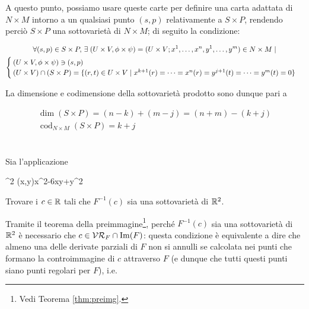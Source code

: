A questo punto, possiamo usare queste carte per definire una carta adattata di $ N \times M $ intorno a un qualsiasi punto $ (s,p) $ relativamente a $ S \times P $, rendendo perciò $ S \times P $ una sottovarietà di $ N \times M $; di seguito la condizione:

\begin{gather}
	\forall (s,p) \in S \times P, \, \exists \; (U \times V, \phi \times \psi) = (U \times V; x^{1},\dots,x^{n}, y^{1},\dots,y^{m}) \in N \times M \mid \nonumber\\
	\begin{cases}
		(U \times V, \phi \times \psi) \ni (s,p)\\
		(U \times V) \cap (S \times P) = \{ (r,t) \in U \times V \mid x^{k+1}(r) = \dots = x^{n}(r) = y^{j+1}(t) = \dots = y^{m}(t) = 0 \}
	\end{cases}
\end{gather}

La dimensione e codimensione della sottovarietà prodotto sono dunque pari a

\begin{gather}
	\dim(S \times P) = (n - k) + (m - j) = (n + m) - (k + j)\\
	\operatorname{cod}_{N \times M}(S \times P) = k + j
\end{gather}

%

\newpage

%

\section{}\label{es2-13}

\begin{tcolorbox}
	Sia l'applicazione
	
		{\R^{2}}{\R}
		{(x,y)}{x^{2}-6xy+y^{2}}
	
	Trovare i $ c \in \mathbb{R} $ tali che $ F^{-1}(c) $ sia una sottovarietà di $ \mathbb{R}^{2} $.
\end{tcolorbox}

Tramite il teorema della preimmagine\footnote{%
	Vedi Teorema \ref{thm:preimg}.%
}, perché $ F^{-1}(c) $ sia una sottovarietà di $ \mathbb{R}^{2} $ è necessario che $ c \in \mathcal{VR}_{F} \cap \Im(F) $: questa condizione è equivalente a dire che almeno una delle derivate parziali di $ F $ non si annulli se calcolata nei punti che formano la controimmagine di $ c $ attraverso $ F $ (e dunque che tutti questi punti siano punti regolari per $ F $), i.e.

